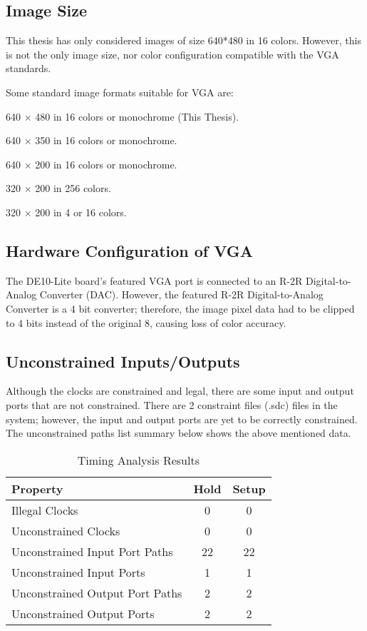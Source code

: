 \subsection{Image Size}
\par This thesis has only considered images of size 640*480 in 16 colors. However, this is not the only image size, nor color configuration compatible with the VGA standards. \newline
\par Some standard image formats suitable for VGA are: \newline

\begin{description}
	\item 640 × 480 in 16 colors or monochrome (This Thesis).
	\item 640 × 350 in 16 colors or monochrome. 
	\item 640 × 200 in 16 colors or monochrome.
	\item 320 × 200 in 256 colors.
	\item 320 × 200 in 4 or 16 colors.
\end{description}

\subsection{Hardware Configuration of VGA}
\par The DE10-Lite board's featured VGA port is connected to an R-2R Digital-to-Analog Converter (DAC). However, the featured R-2R Digital-to-Analog Converter is a 4 bit converter; therefore, the image pixel data had to be clipped to 4 bits instead of the original 8, causing loss of color accuracy.  \newline

\subsection{Unconstrained Inputs/Outputs}
\par Although the clocks are constrained and legal, there are some input and output ports that are not constrained. There are 2 constraint files (.sdc) files in the system; however, the input and output ports are yet to be correctly constrained. The unconstrained paths list summary below shows the above mentioned data. \newline

\begin{table}[H]
	\centering
	\caption{Timing Analysis Results}
	\begin{tabular}{lcc}
		\toprule
		\textbf{Property} & \textbf{Hold} & \textbf{Setup} \\
		\midrule
		Illegal Clocks & 0 & 0 \\
		Unconstrained Clocks & 0 & 0 \\
		Unconstrained Input Port Paths & 22 & 22 \\
		Unconstrained Input Ports & 1 & 1 \\
		Unconstrained Output Port Paths & 2 & 2 \\
		Unconstrained Output Ports & 2 & 2 \\
		\bottomrule
	\end{tabular}
\end{table}
